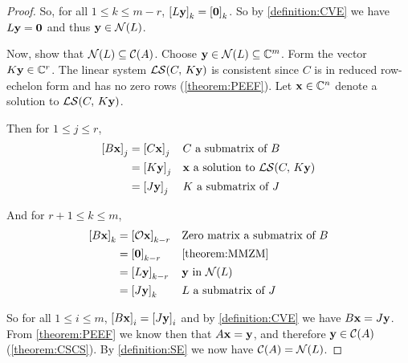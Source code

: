 \documentclass{ximera}
\begin{document}
\begin{theorem}
\begin{proof}
  So, for all $1\leq k\leq m-r$,
  $\left\lbrack L\mathbf{y}\right\rbrack_{k}=\left\lbrack\mathbf{0}\right\rbrack_{k}$.  So by
  \ref{definition:CVE} we have $L\mathbf{y}=\mathbf{0}$ and thus
  $\mathbf{y}\in\mathcal{N}\!\left(L\right)$.

  Now, show that $\mathcal{N}\!\left(L\right)\subseteq\mathcal{C}\!\left(A\right)$.  Choose
  $\mathbf{y}\in\mathcal{N}\!\left(L\right)\subseteq\mathbb{C}^{m}$.  Form the vector
  $K\mathbf{y}\in\mathbb{C}^{r}$.  The linear system
  $\mathcal{LS}\!\left(C,\,K\mathbf{y}\right)$ is consistent since $C$ is in reduced
  row-echelon form and has no zero rows (\ref{theorem:PEEF}).  Let
  $\mathbf{x}\in\mathbb{C}^{n}$ denote a solution to
  $\mathcal{LS}\!\left(C,\,K\mathbf{y}\right)$.

  Then for $1\leq j\leq r$,
  \begin{align*}
    \left\lbrack B\mathbf{x}\right\rbrack_{j}
    &=\left\lbrack C\mathbf{x}\right\rbrack_{j}
    &&\text{$C$ a submatrix of $B$}\\
    &=\left\lbrack K\mathbf{y}\right\rbrack_{j}
    &&\text{$\mathbf{x}$ a solution to $\mathcal{LS}\!\left(C,\,K\mathbf{y}\right)$}\\
    &=\left\lbrack J\mathbf{y}\right\rbrack_{j}
    &&\text{$K$ a submatrix of $J$}\\
  \end{align*}
  
  And for $r+1\leq k\leq m$,
  \begin{align*}
    \left\lbrack B\mathbf{x}\right\rbrack_{k}
    &=\left\lbrack\mathcal{O}\mathbf{x}\right\rbrack_{k-r}
    &&\text{Zero matrix a submatrix of $B$}\\
    &=\left\lbrack\mathbf{0}\right\rbrack_{k-r}
    &&\ref{theorem:MMZM}\\
    &=\left\lbrack L\mathbf{y}\right\rbrack_{k-r}
    &&\text{$\mathbf{y}$ in $\mathcal{N}\!\left(L\right)$}\\
    &=\left\lbrack J\mathbf{y}\right\rbrack_{k}
    &&\text{$L$ a submatrix of $J$}\\
  \end{align*}
  
  So for all $1\leq i\leq m$,
  $\left\lbrack B\mathbf{x}\right\rbrack_{i}=\left\lbrack J\mathbf{y}\right\rbrack_{i}$ and by
  \ref{definition:CVE} we have $B\mathbf{x}=J\mathbf{y}$.  From
  \ref{theorem:PEEF} we know then that $A\mathbf{x}=\mathbf{y}$, and
  therefore $\mathbf{y}\in\mathcal{C}\!\left(A\right)$ (\ref{theorem:CSCS}).  By
  \ref{definition:SE} we now have $\mathcal{C}\!\left(A\right)=\mathcal{N}\!\left(L\right)$.


\end{proof}
\end{theorem}
\end{document}
